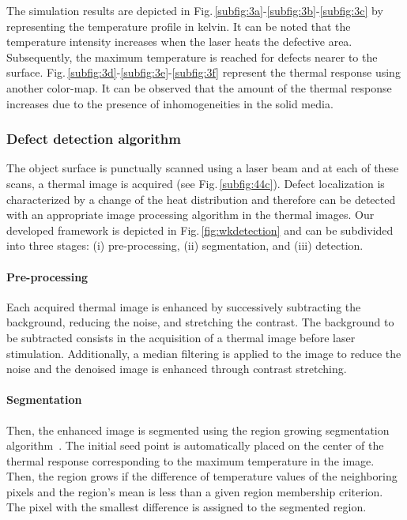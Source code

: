 The simulation results are depicted in Fig.\,\ref{subfig:3a}-\ref{subfig:3b}-\ref{subfig:3c} by representing the temperature profile in kelvin. It can be noted that the temperature intensity increases when the laser heats the defective area. Subsequently, the maximum temperature is reached for defects nearer to the surface. Fig.\,\ref{subfig:3d}-\ref{subfig:3e}-\ref{subfig:3f} represent the thermal response using another color-map. It can be observed that the amount of the thermal response increases due to the presence of inhomogeneities in the solid media.
	
\subsubsection{Defect detection algorithm}\label{subsec:312}



The object surface is punctually scanned using a laser beam and at each of these scans, a thermal image is acquired (see Fig.\,\ref{subfig:44c}).
Defect localization is characterized by a change of the heat distribution and therefore can be detected with an appropriate image processing algorithm in the thermal images.
Our developed framework is depicted in Fig.\,\ref{fig:wkdetection} and can be subdivided into three stages: (i) pre-processing, (ii) segmentation, and (iii) detection.

\paragraph{Pre-processing} Each acquired thermal image is enhanced by successively subtracting the background, reducing the noise, and stretching the contrast. The background to be subtracted consists in the acquisition of a thermal image before laser stimulation. Additionally, a median filtering is applied to the image to reduce the noise and the denoised image is enhanced through contrast stretching.
\paragraph{Segmentation} Then, the enhanced image is segmented using the region growing segmentation algorithm~\cite{Adams1994}. 
The initial seed point is automatically placed on the center of the thermal response corresponding to the maximum temperature in the image.
Then, the region grows if the difference of temperature values of the neighboring pixels and the region's mean is less than a given region membership criterion.
The pixel with the smallest difference is assigned to the segmented region.
